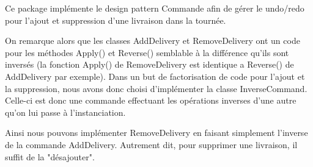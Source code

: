 Ce package impl\'emente le design pattern Commande afin de g\'erer le undo/redo pour l'ajout et
suppression d'une livraison dans la tourn\'ee.

On remarque alors que les classes AddDelivery et
RemoveDelivery ont un code pour les m\'ethodes Apply() et Reverse() semblable \`a la diff\'erence
qu'ils sont invers\'es (la fonction Apply() de RemoveDelivery est identique a Reverse() de
AddDelivery par exemple). Dans un but de factorisation de code pour l'ajout
et la suppression, nous avons donc choisi d'impl\'ementer la classe InverseCommand. Celle-ci est donc une
commande effectuant les op\'erations inverses d'une autre qu'on lui passe \`a l'instanciation.

Ainsi nous pouvons impl\'ementer RemoveDelivery en faisant simplement l'inverse de la commande
AddDelivery. Autrement dit, pour supprimer une livraison, il suffit de la "d\'esajouter".



